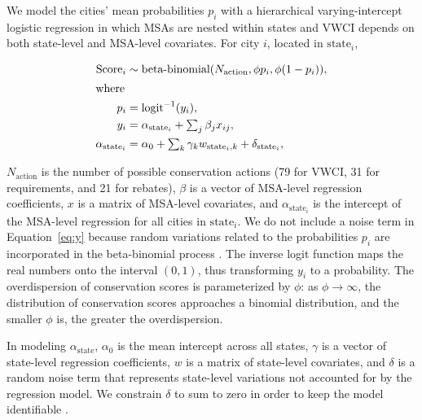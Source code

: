 \documentclass[draft,linenumbers]{agujournal}
\begin{document}
We model the cities' mean probabilities $p_i$
with a hierarchical varying-intercept logistic
regression in which MSAs are nested within states and VWCI depends on both
state-level and MSA-level covariates.
For city $i$, located in $\text{state}_i$,
\begin{linenomath*}
\begin{align}
\text{Score}_i \sim{}& \text{beta-binomial}(N_{\text{action}}, \phi p_i, \phi (1 - p_i)), \\
\intertext{where}
p_i ={}& \text{logit}^{-1}(y_i),\\
y_i ={}& \alpha_{\text{state}_i} + \textstyle\sum_j \beta_j x_{ij}, \label{eq:y}\\
\alpha_{\text{state}_i} ={}&
\alpha_0  + \textstyle\sum_k \gamma_k w_{\text{state}_i, k} + \delta_{\text{state}_i},
\end{align}
\end{linenomath*}
$N_{\text{action}}$ is the number of possible conservation actions
(79 for VWCI, 31 for requirements, and
21 for rebates),
$\beta$ is a vector of MSA-level regression coefficients,
$x$ is a matrix of MSA-level covariates,
and $\alpha_{\text{state}_i}$ is the intercept of the MSA-level regression
for all cities in $\text{state}_i$.
We do not include a noise term in Equation~\ref{eq:y} because random variations
related to the probabilities $p_i$ are incorporated in the beta-binomial
process \citep[p.~321]{gelman:arm:2007}.
The inverse logit function maps the real numbers onto the interval $(0,1)$,
thus transforming $y_i$ to a probability.
The overdispersion of conservation scores is parameterized by $\phi$:
as $\phi \rightarrow \infty$, the distribution of conservation scores approaches
a binomial distribution, and the smaller $\phi$ is, the greater the
overdispersion.

In modeling $\alpha_{\text{state}}$,
$\alpha_0$ is the mean intercept across all states,
$\gamma$ is a vector of state-level regression coefficients,
$w$ is a matrix of state-level covariates,
and
$\delta$ is a random noise term that represents state-level variations not
accounted for by the regression model.
We constrain $\delta$ to sum to zero in order to keep the model identifiable
\citep[Ch.~23]{stan:manual:2015}.
\end{document}
